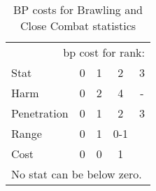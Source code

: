 
\begin{table}[ht]\centering
\begin{tabular}{l*4c}
\toprule
		 \multicolumn{5}{r}{bp cost for rank:} \\
Stat		& 0	& 1	& 2	& 3 \\
\midrule
Harm		& 0	& 2	& 4	& - \\
Penetration	& 0	& 1	& 2	& 3 \\
\midrule
Range		& 0	& 1	& 0-1	&  \\
Cost		& 0	& 0	& 1	&  \\
\bottomrule
\multicolumn{5}{l}{
No stat can be below zero.
}
\end{tabular}
\caption{BP costs for Brawling and Close Combat statistics}
\label{tab:brawling-close-combat-statistics}
\end{table}
